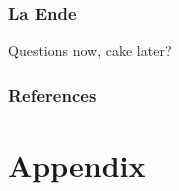 \documentclass[aspectratio=169]{beamer}
\begin{document}
\begin{frame}[fragile]
	\frametitle{La Ende}
    \Large Questions now, cake later? 
\end{frame}


\begin{frame}
	\frametitle{References}
    
    \tiny
	
\end{frame}




\section{Appendix}
\end{document}
